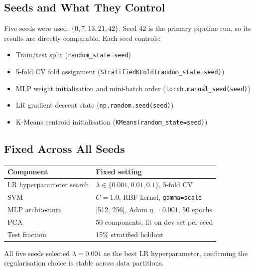 \documentclass[11pt,letterpaper]{article}
\begin{document}
\subsection{Seeds and What They Control}

Five seeds were used: $\{0, 7, 13, 21, 42\}$.  Seed 42 is the primary
pipeline run, so its results are directly comparable.  Each seed controls:

\begin{itemize}[leftmargin=2em,itemsep=1pt]
  \item Train/test split (\texttt{random\_state=seed})
  \item 5-fold CV fold assignment (\texttt{StratifiedKFold(random\_state=seed)})
  \item MLP weight initialisation and mini-batch order
        (\texttt{torch.manual\_seed(seed)})
  \item LR gradient descent state (\texttt{np.random.seed(seed)})
  \item K-Means centroid initialisation (\texttt{KMeans(random\_state=seed)})
\end{itemize}

\subsection{Fixed Across All Seeds}

\begin{center}
\begin{tabular}{ll}
  \toprule
  Component & Fixed setting \\
  \midrule
  LR hyperparameter search & $\lambda \in \{0.001, 0.01, 0.1\}$, 5-fold CV \\
  SVM                      & $C=1.0$, RBF kernel, \texttt{gamma=scale} \\
  MLP architecture         & [512, 256], Adam $\eta=0.001$, 50 epochs \\
  PCA                      & 50 components, fit on dev set per seed \\
  Test fraction            & 15\% stratified holdout \\
  \bottomrule
\end{tabular}
\end{center}

All five seeds selected $\lambda = 0.001$ as the best LR hyperparameter,
confirming the regularisation choice is stable across data partitions.

\end{document}
